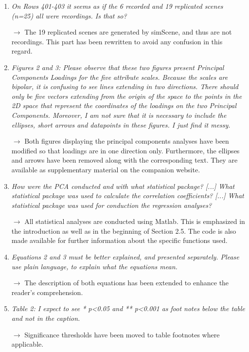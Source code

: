 \documentclass[10pt]{article}
\begin{document}
\begin{enumerate}
\item \emph{On Rows 401-403 it seems as if the 6 recorded and 19 replicated scenes (n=25) all were recordings. Is that so?}

$\rightarrow$ The 19 replicated scenes are generated by simScene, and thus are not recordings. This part has been rewritten to avoid any confusion in this regard.

\item \emph{Figures 2 and 3: Please observe that these two figures present Principal Components Loadings for the five attribute scales. Because the scales are bipolar, it is confusing to see lines extending in two directions. There should only be five vectors extending from the origin of the space to the points in the 2D space that represent the coordinates of the loadings on the two Principal Components. Moreover, I am not sure that it is necessary to include the ellipses, short arrows and datapoints in these figures. I just find it messy.}

$\rightarrow$ Both figures displaying the principal components analyses have been modified so that loadings are in one direction only. Furthermore, the ellipses and arrows have been removed along with the corresponding text. They are available as supplementary material on the companion website.

\item \emph{How were the PCA conducted and with what statistical package? [...] What statistical package was used to calculate the correlation coefficients? [...] What statistical package was used for conduction the regression analyses?}

$\rightarrow$ All statistical analyses are conducted using Matlab. This is emphasized in the introduction as well as in the beginning of Section 2.5. The code is also made available for further information about the specific functions used.

\item \emph{Equations 2 and 3 must be better explained, and presented separately. Please use plain language, to explain what the equations mean.}

$\rightarrow$ The description of both equations has been extended to enhance the reader's comprehension.

\item \emph{Table 2: I expect to see * p<0.05 and ** p<0.001 as foot notes below the table and not in the caption.}

$\rightarrow$ Significance thresholds have been moved to table footnotes where applicable.


\end{enumerate}
\end{document}
